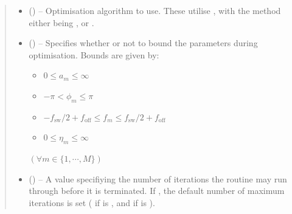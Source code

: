 \documentclass[letterpaper,10pt,english]{sphinxmanual}
\begin{document}
\begin{fulllineitems}
\begin{quote}
\begin{description}
\begin{itemize}
\item {} 
\sphinxAtStartPar
{} (\sphinxstyleliteralemphasis{\sphinxupquote{, }}) – Optimisation algorithm to use. These utilise
, with
the method either being , or
.

\item {} 
\sphinxAtStartPar
{} (\sphinxstyleliteralemphasis{\sphinxupquote{, }}) – 
\sphinxAtStartPar
Specifies whether or not to bound the parameters during optimisation.
Bounds are given by:
\begin{itemize}
\item {} 
\sphinxAtStartPar
\(0 \leq a_m \leq \infty\)

\item {} 
\sphinxAtStartPar
\(-\pi < \phi_m \leq \pi\)

\item {} 
\sphinxAtStartPar
\(-f_{\mathrm{sw}} / 2 + f_{\mathrm{off}} \leq f_m \leq        f_{\mathrm{sw}} / 2 + f_{\mathrm{off}}\)

\item {} 
\sphinxAtStartPar
\(0 \leq \eta_m \leq \infty\)

\end{itemize}

\sphinxAtStartPar
\((\forall m \in \{1, \cdots, M\})\)


\item {} 
\sphinxAtStartPar
{} (\sphinxstyleliteralemphasis{\sphinxupquote{, }}) – A value specifiying the number of iterations the routine may run
through before it is terminated. If , the default number
of maximum iterations is set ( if  is ,
and  if  is ).


\end{itemize}
\end{description}
\end{quote}
\end{fulllineitems}
\end{document}
